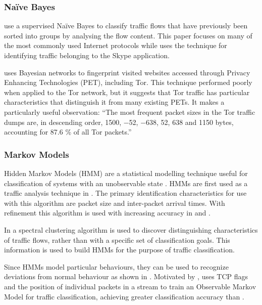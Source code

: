 \documentclass{ecuthesis}
\begin{document}
\subsubsection{Na\"{i}ve Bayes}

\textcite{Moore:2005p3827} use a supervised Na\"{i}ve Bayes to classify traffic
flows that have previously been sorted into groups by analysing the flow
content. This paper focuses on many of the most commonly used Internet
protocols while \textcite{Bonfiglio:2007p6453} uses the technique for
identifying traffic belonging to the Skype application.

\textcite{Herrmann:2009p1189} uses Bayesian networks to fingerprint visited
websites accessed through Privacy Enhancing Technologies (PET), including Tor.
This technique performed poorly when applied to the Tor network, but it
suggests that Tor traffic has particular characteristics that distinguish it
from many existing PETs. It makes a particularly useful observation: ``The most
frequent packet sizes in the Tor traffic dumps are, in descending order, 1500,
−52, −638, 52, 638 and 1150 bytes, accounting for 87.6 \% of all Tor packets.''

\subsubsection{Markov Models}

Hidden Markov Models (HMM) are a statistical modelling technique useful
for classification of systems with an unobservable state
\parencite{Rabiner:1990p1153}. HMMs are first used as a traffic analysis
technique in  \parencite{Wright:2004p3860}. The
primary identification characteristics for use with this algorithm are packet
size and inter-packet arrival times. With refinement this algorithm is used
with increasing accuracy in \textcite{Wright:2006p322} and
\textcite{Dainotti:2008p1435}.

In \textcite{Bernaille:2005p6205} a spectral clustering algorithm is used to
discover distinguishing characteristics of traffic flows, rather than with a
specific set of classification goals. This information is used to build HMMs
for the purpose of traffic classification.

Since HMMs model particular behaviours, they can be used to recognize
deviations from normal behaviour as shown in
\textcite{EstevezTapiador:2003p7201}. Motivated by
\citeauthor{EstevezTapiador:2003p7201}, \textcite{Munz:2010p7085} uses TCP
flags and the position of individual packets in a stream to train an Observable
Markov Model for traffic classification, achieving greater classification
accuracy than \citeauthor{Bernaille:2005p6205}.
\end{document}
